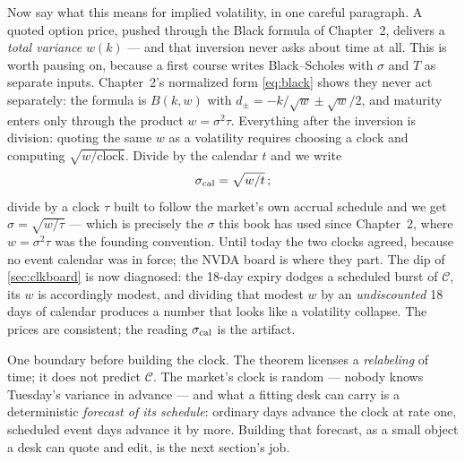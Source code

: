 Now say what this means for implied volatility, in one careful
paragraph.  A quoted option price, pushed through the Black formula
of Chapter~2, delivers a \emph{total variance} $w(k)$ --- and that
inversion never asks about time at all.  This is worth pausing on,
because a first course writes Black--Scholes with $\sigma$ and $T$ as
separate inputs.  Chapter~2's normalized form \eqref{eq:black} shows
they never act separately: the formula is $B(k,w)$ with
$d_\pm=-k/\sqrt{w}\pm\sqrt{w}/2$, and maturity enters only through
the product $w=\sigma^2\tau$.  Everything after the inversion is
division: quoting the same $w$ as a volatility requires choosing a
clock and computing $\sqrt{w/\text{clock}}$.  Divide by the calendar
$t$ and we write
\[
\sigma_{\rm cal}=\sqrt{w/t}\,;
\]
divide by a clock $\tau$ built to follow the market's own accrual
schedule and we get $\sigma=\sqrt{w/\tau}$ --- which is precisely the
$\sigma$ this book has used since Chapter~2, where $w=\sigma^2\tau$
was the founding convention.  Until today the two clocks agreed,
because no event calendar was in force; the NVDA board is where they
part.  The dip of \cref{sec:clkboard} is now diagnosed: the 18-day
expiry dodges a scheduled burst of $\mathcal{C}$, its $w$ is
accordingly modest, and dividing that modest $w$ by an
\emph{undiscounted} 18 days of calendar produces a number that looks
like a volatility collapse.  The prices are consistent; the reading
$\sigma_{\rm cal}$ is the artifact.

One boundary before building the clock.  The theorem licenses
a \emph{relabeling} of time; it does not predict $\mathcal{C}$.  The
market's clock is random --- nobody knows Tuesday's variance in
advance --- and what a fitting desk can carry is a deterministic
\emph{forecast of its schedule}: ordinary days advance the clock at
rate one, scheduled event days advance it by more.  Building that
forecast, as a small object a desk can quote and edit, is the next
section's job.
